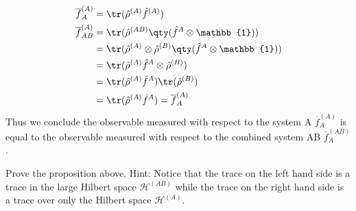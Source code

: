 \documentclass[boxes,pages]{homework}
\makeatletter
\newcommand{\hilb}{\mathcal{H}}
\numberwithin{@problem}{section}
\makeatother
\begin{document}
\begin{solution}
	\begin{align*}
		\overline{f}_A^{(A)}    & = \tr(\hat{\rho}^{(A)}\hat{f}^{(A)})                                             \\
		\overline{f}_{AB}^{(A)} & = \tr(\hat{\rho}^{(AB)}\qty(\hat{f}^{A}\otimes\mathbb{1}))                       \\
		                        & = \tr(\hat{\rho}^{(A)}\otimes\hat{\rho}^{(B)}\qty(\hat{f}^{A}\otimes\mathbb{1})) \\
		                        & = \tr(\hat{\rho}^{(A)}\hat{f}^{A}\otimes\hat{\rho}^{(B)})                        \\
		                        & = \tr(\hat{\rho}^{(A)}\hat{f}^{A})\tr(\hat{\rho}^{(B)})                          \\
		                        & = \tr(\hat{\rho}^{(A)}\hat{f}^{A}) = \overline{f}_A^{(A)}
	\end{align*}
	Thus we conclude the observable measured with respect to the system A $\overline{f}_A^{(A)}$ is equal to the observable measured with respect to the combined system AB $\overline{f}_A^{(AB)}$.
\end{solution}

\begin{problem}
Prove the proposition above. Hint: Notice that the trace on the left hand side is a trace in the large Hilbert space $\hilb^{(AB)}$ while the trace on the right hand side is a trace over only the Hilbert space $\hilb^{(A)}$.
\end{problem}
\end{document}
